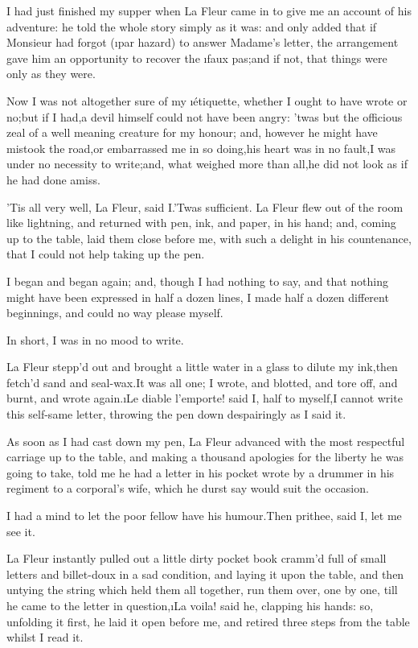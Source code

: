 \documentclass[twoside]{article}
\begin{document}
I had just finished my supper when La Fleur came in to give me an account
of his adventure: he told the whole story simply as it was: and only
added that if Monsieur had forgot (\i{par hazard}) to answer Madame’s
letter, the arrangement gave him an opportunity to recover the \i{faux
pas};\tsk and if not, that things were only as they were.

Now I was not altogether sure of my \i{étiquette}, whether I ought to have
wrote or no;\tsk but if I had,\tsk a devil himself could not have been angry:
’twas but the officious zeal of a well meaning creature for my honour;
and, however he might have mistook the road,\tsk or embarrassed me in so
doing,\tsk his heart was in no fault,\tsk I was under no necessity to write;\tsk and,
what weighed more than all,\tsk he did not look as if he had done amiss.

\tsk ’Tis all very well, La Fleur, said I.\tsk ’Twas sufficient.  La Fleur flew
out of the room like lightning, and returned with pen, ink, and paper, in
his hand; and, coming up to the table, laid them close before me, with
such a delight in his countenance, that I could not help taking up the
pen.

I began and began again; and, though I had nothing to say, and that
nothing might have been expressed in half a dozen lines, I made half a
dozen different beginnings, and could no way please myself.

In short, I was in no mood to write.

La Fleur stepp’d out and brought a little water in a glass to dilute my
ink,\tsk then fetch’d sand and seal-wax.\tsk It was all one; I wrote, and
blotted, and tore off, and burnt, and wrote again.\tsk \i{Le diable l’emporte}!
said I, half to myself,\tsk I cannot write this self-same letter, throwing
the pen down despairingly as I said it.

As soon as I had cast down my pen, La Fleur advanced with the most
respectful carriage up to the table, and making a thousand apologies for
the liberty he was going to take, told me he had a letter in his pocket
wrote by a drummer in his regiment to a corporal’s wife, which he durst
say would suit the occasion.

I had a mind to let the poor fellow have his humour.\tsk Then prithee, said
I, let me see it.

La Fleur instantly pulled out a little dirty pocket book cramm’d full of
small letters and billet-doux in a sad condition, and laying it upon the
table, and then untying the string which held them all together, run them
over, one by one, till he came to the letter in question,\tsk \i{La voila}!
said he, clapping his hands: so, unfolding it first, he laid it open
before me, and retired three steps from the table whilst I read it.
\end{document}

